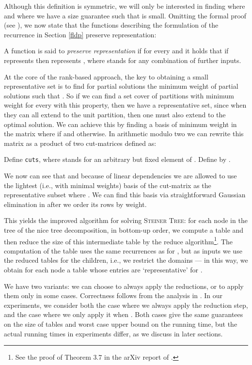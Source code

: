\documentclass{llncs}
\begin{document}
Although this definition is symmetric, we will only be interested in finding  where  and where we have a size guarantee such that  is small.
Omitting the formal proof (see \cite{BodlaenderCKN12}), we now state that the functions describing the formulation of the recurrence in Section \ref{fldp} preserve representation:
\begin{definition}
A function  is said to \emph{preserve representation} if for every  and  it holds that if  represents  then  represents , where  stands for any combination of further inputs.
\end{definition}

At the core of the rank-based approach, the key to obtaining a small representative set is to find for partial solutions  the minimum weight of partial solutions  such that . So if we can find a set cover of partitions  with minimum weight for every  with this property, then we have a representative set, since when they can all extend to the unit partition, then one must also extend to the optimal solution. We can achieve this by finding a basis of minimum weight in the matrix  where  if  and  otherwise. In arithmetic modulo two we can rewrite this matrix as a product of two cut-matrices  defined as:
\begin{definition}
Define \texttt{cuts}, where  stands for an arbitrary but fixed element of . Define  by .
\end{definition}

We now can see that  and because of linear dependencies we are allowed to use the lightest (i.e., with minimal weights)
basis of the cut-matrix  as the representative subset  where . We can find this basis via straightforward Gaussian elimination in  after we order its rows by weight.

This yields the improved algorithm for solving \textsc{Steiner Tree}: for each node in the tree of the nice tree decomposition, in bottom-up
order, we compute a table and then reduce the size of this intermediate table by the reduce algorithm\footnote{See the proof of Theorem 3.7 in the arXiv report of \cite{BodlaenderCKN12}.}. 
The computation of the table
uses the same recurrences as for , but as inputs we use the reduced tables for the children,
i.e., we restrict the domains --- in this way, we obtain for
each node a table whose entries are `representative' for .

We have two variants: we can choose to 
always apply the reductions, or to apply them only in some cases. Correctness follows from the analysis in \cite{BodlaenderCKN12}.
In our experiments, we consider both the case where we always apply the reduction step, and the case where we only apply it 
when . Both cases give the same guarantees on the size of tables and worst case upper bound on the running time, but the
actual running times in experiments differ, as we discuss in later sections.
\end{document}
